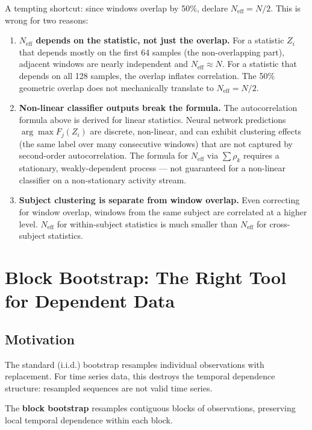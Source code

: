 \documentclass[11pt, a4paper]{article}
\theoremstyle{definition}
\theoremstyle{plain}
\begin{document}
A tempting shortcut: since windows overlap by 50\%, declare $N_{\text{eff}} = N/2$.
This is wrong for two reasons:

\begin{enumerate}[leftmargin=1.5em]
  \item \textbf{$N_{\text{eff}}$ depends on the statistic, not just the overlap.}
        For a statistic $Z_i$ that depends mostly on the first 64 samples (the
        non-overlapping part), adjacent windows are nearly independent and
        $N_{\text{eff}} \approx N$. For a statistic that depends on all 128 samples,
        the overlap inflates correlation. The 50\% geometric overlap does not
        mechanically translate to $N_{\text{eff}} = N/2$.
  \item \textbf{Non-linear classifier outputs break the formula.}
        The autocorrelation formula above is derived for linear statistics.
        Neural network predictions $\arg\max F_j(Z_i)$ are discrete, non-linear,
        and can exhibit clustering effects (the same label over many consecutive
        windows) that are not captured by second-order autocorrelation. The
        formula for $N_{\text{eff}}$ via $\sum \rho_k$ requires a stationary,
        weakly-dependent process — not guaranteed for a non-linear classifier on
        a non-stationary activity stream.
  \item \textbf{Subject clustering is separate from window overlap.}
        Even correcting for window overlap, windows from the same subject are
        correlated at a higher level. $N_{\text{eff}}$ for within-subject
        statistics is much smaller than $N_{\text{eff}}$ for cross-subject statistics.
\end{enumerate}

\section{Block Bootstrap: The Right Tool for Dependent Data}

\subsection{Motivation}

The standard (i.i.d.) bootstrap resamples individual observations with replacement.
For time series data, this destroys the temporal dependence structure: resampled
sequences are not valid time series.

The \textbf{block bootstrap} resamples contiguous blocks of observations, preserving
local temporal dependence within each block.
\end{document}
